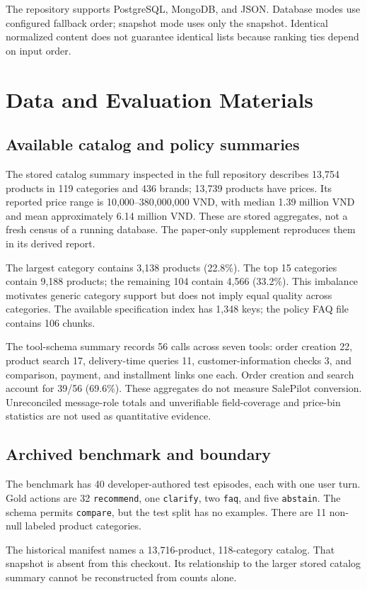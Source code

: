 \documentclass[conference,a4paper]{IEEEtran}
\newcommand{\code}[1]{\texttt{#1}}
\begin{document}
The repository supports PostgreSQL, MongoDB, and JSON. Database modes use configured fallback order; snapshot mode uses only the snapshot. Identical normalized content does not guarantee identical lists because ranking ties depend on input order.

\section{Data and Evaluation Materials}
\subsection{Available catalog and policy summaries}
The stored catalog summary inspected in the full repository describes 13{,}754 products in 119 categories and 436 brands; 13{,}739 products have prices. Its reported price range is 10{,}000--380{,}000{,}000 VND, with median 1.39 million VND and mean approximately 6.14 million VND. These are stored aggregates, not a fresh census of a running database. The paper-only supplement reproduces them in its derived report.

The largest category contains 3{,}138 products (22.8\%). The top 15 categories contain 9{,}188 products; the remaining 104 contain 4{,}566 (33.2\%). This imbalance motivates generic category support but does not imply equal quality across categories. The available specification index has 1{,}348 keys; the policy FAQ file contains 106 chunks.

The tool-schema summary records 56 calls across seven tools: order creation 22, product search 17, delivery-time queries 11, customer-information checks 3, and comparison, payment, and installment links one each. Order creation and search account for 39/56 (69.6\%). These aggregates do not measure SalePilot conversion. Unreconciled message-role totals and unverifiable field-coverage and price-bin statistics are not used as quantitative evidence.

\subsection{Archived benchmark and boundary}
The benchmark has 40 developer-authored test episodes, each with one user turn. Gold actions are 32 \code{recommend}, one \code{clarify}, two \code{faq}, and five \code{abstain}. The schema permits \code{compare}, but the test split has no examples. There are 11 non-null labeled product categories.

The historical manifest names a 13{,}716-product, 118-category catalog. That snapshot is absent from this checkout. Its relationship to the larger stored catalog summary cannot be reconstructed from counts alone.
\end{document}
